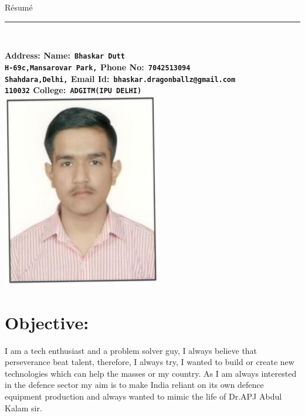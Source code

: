 \documentclass[10pt]{report}
\begin{document}
	
{\huge\hspace{210pt}R\'{e}sum\'{e}}
\\{\noindent\rule{18cm}{0.8pt}\\[4pt]}
\bf Address: \hspace{258pt}\bf Name:\verb| Bhaskar Dutt|
\\
\verb"H-69c,Mansarovar Park,"  \hspace{188pt}\bf Phone No:\verb" 7042513094"
\\{\verb"Shahdara,Delhi,"}   \hspace{226pt}\bf Email Id:\verb" bhaskar.dragonballz@gmail.com"
\\{\verb"110032"}    \hspace{272pt}\bf College:\verb" ADGITM(IPU DELHI)" \\[1pt]

{\hspace{330pt}\includegraphics[scale =0.5]{bhaskar}\\[3pt]} %

\section*{Objective:} 
\normalfont I am a tech enthusiast and a problem solver guy, I always believe that perseverance beat talent, therefore, I always try, I wanted to build or create new technologies which can help the masses or my country. As I am always interested in the defence sector my aim is to make India reliant on its own defence equipment production and always wanted to mimic the life of Dr.APJ Abdul Kalam sir.
\end{document}
